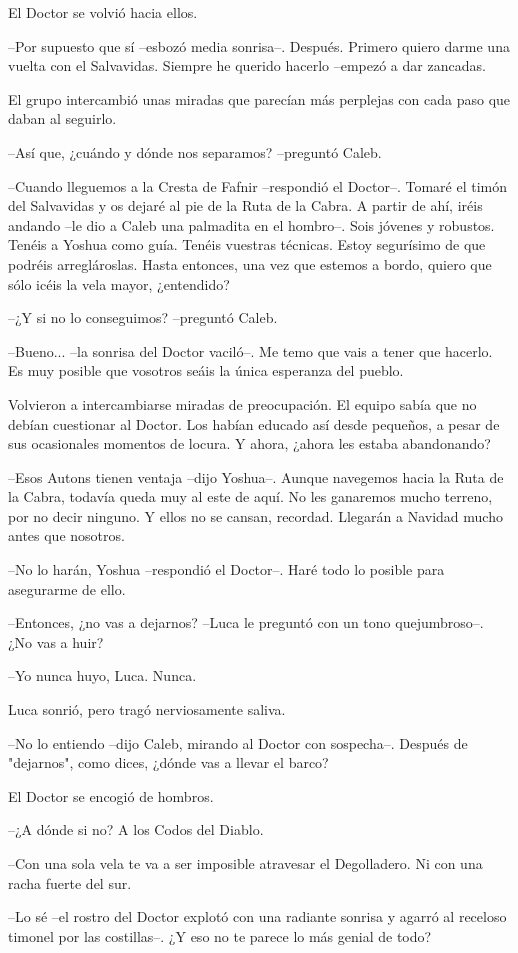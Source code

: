 El Doctor se volvió hacia ellos.
 
--Por supuesto que sí --esbozó media sonrisa--. Después. Primero quiero darme una vuelta con el Salvavidas. Siempre he querido hacerlo --empezó a dar zancadas.
 
El grupo intercambió unas miradas que parecían más perplejas con cada paso que daban al seguirlo.
 
--Así que, ¿cuándo y dónde nos separamos? --preguntó Caleb.
 
--Cuando lleguemos a la Cresta de Fafnir --respondió el Doctor--. Tomaré el timón del Salvavidas y os dejaré al pie de la Ruta de la Cabra. A partir de ahí, iréis andando --le dio a Caleb una palmadita en el hombro--. Sois jóvenes y robustos. Tenéis a Yoshua como guía. Tenéis vuestras técnicas. Estoy segurísimo de que podréis arreglároslas. Hasta entonces, una vez que estemos a bordo, quiero que sólo icéis la vela mayor, ¿entendido?
 
--¿Y si no lo conseguimos? --preguntó Caleb.
 
--Bueno... --la sonrisa del Doctor vaciló--. Me temo que vais a tener que hacerlo. Es muy posible que vosotros seáis la única esperanza del pueblo.
 
Volvieron a intercambiarse miradas de preocupación. El equipo sabía que no debían cuestionar al Doctor. Los habían educado así desde pequeños, a pesar de sus ocasionales momentos de locura. Y ahora, ¿ahora les estaba abandonando?
 
--Esos Autons tienen ventaja --dijo Yoshua--. Aunque navegemos hacia la Ruta de la Cabra, todavía queda muy al este de aquí. No les ganaremos mucho terreno, por no decir ninguno. Y ellos no se cansan, recordad. Llegarán a Navidad mucho antes que nosotros.
 
--No lo harán, Yoshua --respondió el Doctor--. Haré todo lo posible para asegurarme de ello.
 
--Entonces, ¿no vas a dejarnos? --Luca le preguntó con un tono quejumbroso--. ¿No vas a huir?
 
--Yo nunca huyo, Luca. Nunca.
 
Luca sonrió, pero tragó nerviosamente saliva.
 
--No lo entiendo --dijo Caleb, mirando al Doctor con sospecha--. Después de "dejarnos", como dices, ¿dónde vas a llevar el barco?
 
El Doctor se encogió de hombros.
 
--¿A dónde si no? A los Codos del Diablo.
 
--Con una sola vela te va a ser imposible atravesar el Degolladero. Ni con una racha fuerte del sur.
 
--Lo sé --el rostro del Doctor explotó con una radiante sonrisa y agarró al receloso timonel por las costillas--. ¿Y eso no te parece lo más genial de todo?
